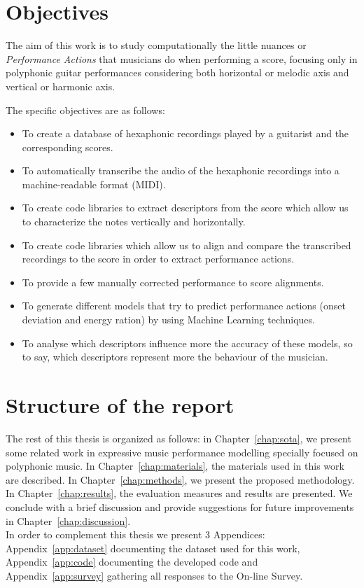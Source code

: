 \section{Objectives}
The aim of this work is to study computationally the little nuances or \textit{Performance Actions} that musicians do when performing a score, focusing only in polyphonic guitar performances considering both horizontal or melodic axis and vertical or harmonic axis.

The specific objectives are as follows:

\begin{itemize}[noitemsep]
\item To create a database of hexaphonic recordings played by a guitarist and the corresponding scores.
\item To automatically transcribe the audio of the hexaphonic recordings into a machine-readable format (MIDI).
\item To create code libraries to extract descriptors from the score which allow us to characterize the notes vertically and horizontally.
\item To create code libraries which allow us to align and compare the transcribed recordings to the score in order to extract performance actions.
\item To provide a few manually corrected performance to score alignments.
\item To generate different models that try to predict performance actions (onset deviation and energy ration) by using Machine Learning techniques.
\item To analyse which descriptors influence more the accuracy of these models, so to say, which descriptors represent more the behaviour of the musician.
\end{itemize}

\section{Structure of the report}
The rest of this thesis is organized as follows: in Chapter~\ref{chap:sota}, we present some related work in expressive music performance modelling specially focused on polyphonic music. In Chapter~\ref{chap:materials}, the materials used in this work are described. In Chapter~\ref{chap:methods}, we present the proposed methodology. In Chapter~\ref{chap:results}, the evaluation measures and results are presented. We conclude with a brief discussion and provide suggestions for future improvements in Chapter~\ref{chap:discussion}. \\
In order to complement this thesis we present 3 Appendices: Appendix~\ref{app:dataset} documenting the dataset used for this work, Appendix~\ref{app:code} documenting the developed code and Appendix~\ref{app:survey} gathering all responses to the On-line Survey.
\cleardoublepage

